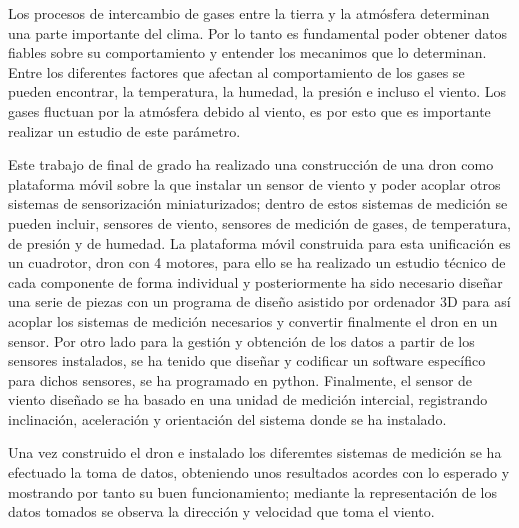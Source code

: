 
Los procesos de intercambio de gases entre la tierra y la atmósfera determinan una parte importante del clima. Por lo tanto es fundamental poder obtener datos fiables sobre su comportamiento y entender los mecanimos que lo determinan. Entre los diferentes factores que afectan al comportamiento de los gases se pueden encontrar, la temperatura, la humedad, la presión e incluso el viento. Los gases fluctuan por la atmósfera debido al viento, es por esto que es importante realizar un estudio de este parámetro.

Este trabajo de final de grado ha realizado una construcción de una dron como plataforma móvil sobre la que instalar un sensor de viento y poder acoplar otros sistemas de sensorización miniaturizados; dentro de estos sistemas de medición se pueden incluir, sensores de viento, sensores de medición de gases, de temperatura, de presión y de humedad. La plataforma móvil construida para esta unificación es un cuadrotor, dron con 4 motores, para ello se ha realizado un estudio técnico de cada componente de forma individual y posteriormente ha sido necesario diseñar una serie de piezas con un programa de diseño asistido por ordenador 3D para así acoplar los sistemas de medición necesarios y convertir finalmente el dron en un sensor. Por otro lado para la gestión y obtención de los datos a partir de los sensores instalados, se ha tenido que diseñar y codificar un software específico para dichos sensores, se ha programado en python. Finalmente, el sensor de viento diseñado se ha basado en una unidad de medición intercial, registrando inclinación, aceleración y orientación del sistema donde se ha instalado.

Una vez construido el dron e instalado los diferemtes sistemas de medición se ha efectuado la toma de datos, obteniendo unos resultados acordes con lo esperado y mostrando por tanto su buen funcionamiento; mediante la representación de los datos tomados se observa la dirección y velocidad que toma el viento.
